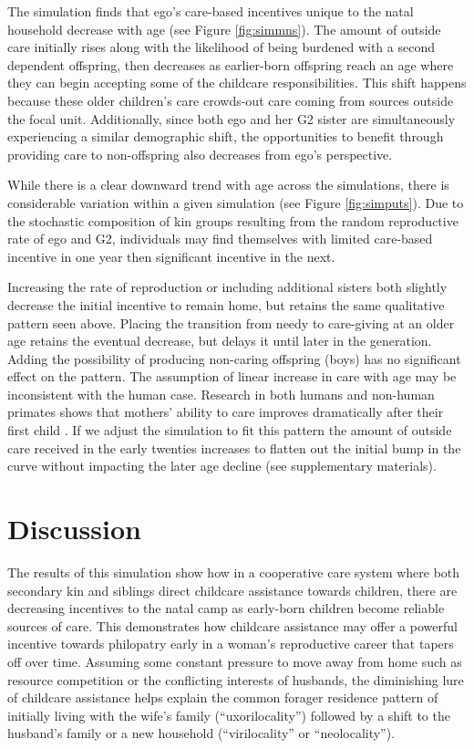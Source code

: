 The simulation finds that ego's care-based incentives unique to the natal household decrease with age (see Figure \ref{fig:simmns}).  The amount of outside care initially rises along with the likelihood of being burdened with a second dependent offspring, then decreases as earlier-born offspring reach an age where they can begin accepting some of the childcare responsibilities.  This shift happens because these older children's care crowds-out care coming from sources outside the focal unit.  Additionally, since both ego and her G2 sister are simultaneously experiencing a similar demographic shift, the opportunities to benefit through providing care to non-offspring also decreases from ego's perspective.   

While there is a clear downward trend with age across the simulations, there is considerable variation within a given simulation (see Figure \ref{fig:simputs}).  Due to the stochastic composition of kin groups resulting from the random reproductive rate of ego and G2, individuals may find themselves with limited care-based incentive in one year then significant incentive in the next. 
 
Increasing the rate of reproduction or including additional sisters both slightly decrease the initial incentive to remain home, but retains the same qualitative pattern seen above.  Placing the transition from needy to care-giving at an older age retains the eventual decrease, but delays it until later in the generation.  Adding the possibility of producing non-caring offspring (boys) has no significant effect on the pattern.  The assumption of linear increase in care with age may be inconsistent with the human case.  Research in both humans and non-human primates shows that mothers' ability to care improves dramatically after their first child \cite[p.~63]{hrdy2009mothers}.  If we adjust the simulation to fit this pattern the amount of outside care received in the early twenties increases to flatten out the initial bump in the curve without impacting the later age decline (see supplementary materials).

\section{Discussion}
\label{sec:3}

The results of this simulation show how in a cooperative care system where both secondary kin and siblings direct childcare assistance towards children, there are decreasing incentives to the natal camp as early-born children become reliable sources of care.  This demonstrates how childcare assistance may offer a powerful incentive towards philopatry early in a woman's reproductive career that tapers off over time.  Assuming some constant pressure to move away from home such as resource competition or the conflicting interests of husbands, the diminishing lure of childcare assistance helps explain the common forager residence pattern of initially living with the wife's family (``uxorilocality'') followed by a shift to the husband's family or a new household (``virilocality'' or ``neolocality'').  

